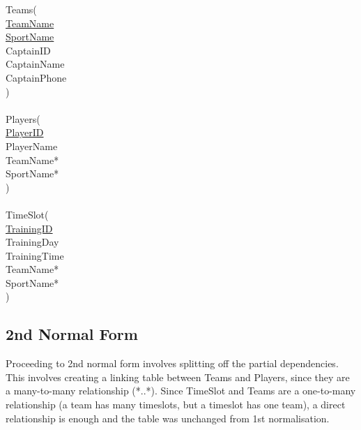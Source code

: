 \documentclass[11pt, article]{article}
\begin{document}
\begin{tabbing}
Teams( \newline \\
	\hspace{5mm}  \underline{TeamName}\\
	\hspace{5mm} \underline{SportName} \\
	\hspace{5mm} CaptainID                      \\
	\hspace{5mm} CaptainName                 \\
	\hspace{5mm} CaptainPhone                \\
)\\
\\
Players( \newline \\
	\hspace{5mm}  \underline{PlayerID}\\
	\hspace{5mm} PlayerName                      \\
	\hspace{5mm}  TeamName*\\
	\hspace{5mm} SportName* \\
)\\
\\
TimeSlot( \newline \\
	\hspace{5mm}  \underline{TrainingID}\\
	\hspace{5mm} TrainingDay                     \\
	\hspace{5mm} TrainingTime \\
	\hspace{5mm}  TeamName*\\
	\hspace{5mm} SportName* \\
)\\
\end{tabbing}
\newpage
\subsection{2nd Normal Form}

Proceeding to 2nd normal form involves splitting off the partial dependencies. This involves creating a linking table between Teams and Players, since they are a many-to-many relationship (*..*). Since TimeSlot and Teams are a one-to-many relationship (a team has many timeslots, but a timeslot has one team), a direct relationship is enough and the table was unchanged from 1st normalisation.
\end{document}
